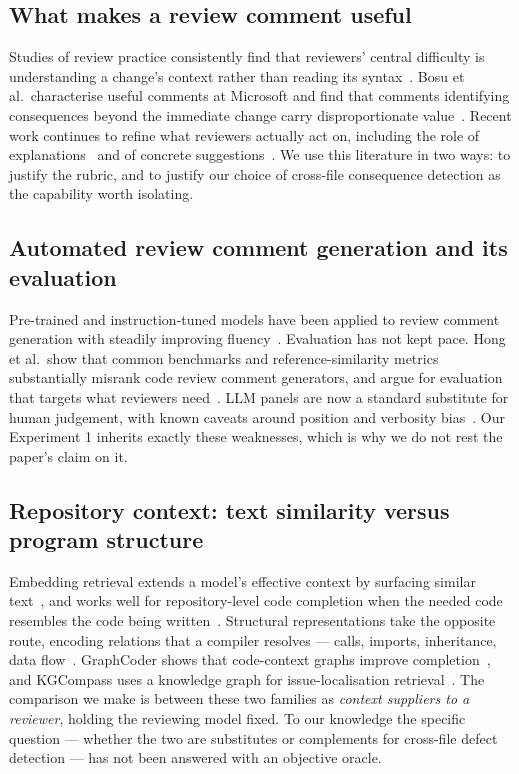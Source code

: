 \documentclass[conference]{IEEEtran}
\begin{document}
\subsection{What makes a review comment useful}
Studies of review practice consistently find that reviewers' central
difficulty is understanding a change's context rather than reading its
syntax~\cite{bacchelli2013, sadowski2018}. Bosu et al.\ characterise useful
comments at Microsoft and find that comments identifying consequences beyond
the immediate change carry disproportionate
value~\cite{bosu2015}. Recent work continues to refine what reviewers
actually act on, including the role of explanations~\cite{widyasari2025explanations}
and of concrete suggestions~\cite{bouraffa2025suggestions}. We use this
literature in two ways: to justify the rubric, and to justify our choice of
cross-file consequence detection as the capability worth isolating.

\subsection{Automated review comment generation and its evaluation}
Pre-trained and instruction-tuned models have been applied to review comment
generation with steadily improving fluency~\cite{li2022codereviewer,
tufano2022codereview, fan2023llmse}. Evaluation has not kept pace. Hong
et al.\ show that common benchmarks and reference-similarity metrics
substantially misrank code review comment generators, and argue for
evaluation that targets what reviewers need~\cite{hong2024deepcrceval}. LLM
panels are now a standard substitute for human judgement, with known
caveats around position and verbosity bias~\cite{zheng2023judging}. Our
Experiment 1 inherits exactly these weaknesses, which is why we do not rest
the paper's claim on it.

\subsection{Repository context: text similarity versus program structure}
Embedding retrieval extends a model's effective context by surfacing
similar text~\cite{lewis2020rag}, and works well for repository-level code
completion when the needed code resembles the code being
written~\cite{zhang2023repocoder}. Structural representations take the
opposite route, encoding relations that a compiler resolves --- calls,
imports, inheritance, data flow~\cite{aho2006compilers,
allamanis2018programgraphs, guo2020graphcodebert}. GraphCoder shows that
code-context graphs improve completion~\cite{liu2024graphcoder}, and
KGCompass uses a knowledge graph for issue-localisation
retrieval~\cite{yang2025kgcompass}. The comparison we make is between these
two families as \emph{context suppliers to a reviewer}, holding the reviewing
model fixed. To our knowledge the specific question --- whether the two are
substitutes or complements for cross-file defect detection --- has not been
answered with an objective oracle.
\end{document}
